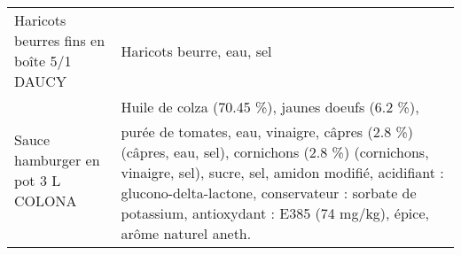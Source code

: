 \begin{longtable}{p{5cm}p{10cm}}
                                                                 Haricots beurres fins en boîte 5/1 DAUCY &                                                                                                                                                                                                                                                                                                                                                                                                                                                                                                                                                                                                                                                                                                                                                                                                                                                                                                                                                                                                                Haricots beurre, eau, sel \\
                                                                        Sauce hamburger en pot 3 L COLONA &                                                                                                                                                                                                                                                                                                                                                                                                                                                                                                                                                                                                                                                                                                    Huile de colza (70.45 \%), jaunes doeufs (6.2 \%), purée de tomates, eau, vinaigre, câpres (2.8 \%) (câpres, eau, sel), cornichons (2.8 \%) (cornichons, vinaigre, sel), sucre, sel, amidon modifié, acidifiant : glucono-delta-lactone, conservateur : sorbate de potassium, antioxydant : E385 (74 mg/kg), épice, arôme naturel aneth. \\

\end{longtable}
